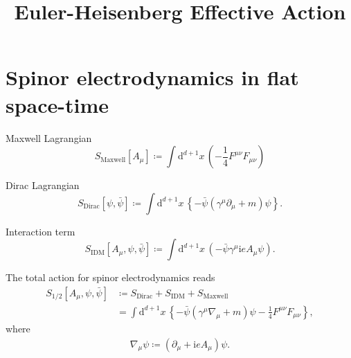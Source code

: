 \documentclass[12pt]{article}
\newcommand\mi{\mathrm{i}} %
\newcommand\dif{\mathrm{d}}
\newcommand{\rbr}[1]{{\left(#1\right)}}
\newcommand{\cbr}[1]{{\left\{#1\right\}}}
\newcommand{\sfun}[2]{{#1}\mathopen{}\left[#2\right]\mathclose{}}
\begin{document}
\title{Euler-Heisenberg Effective Action} 


\date{}







\maketitle

%



\section{Spinor electrodynamics in flat space-time}

Maxwell Lagrangian
\begin{equation}
\sfun{S_\text{Maxwell}}{A_\mu} \coloneqq \int\dif^{d+1} x\,\rbr{
-\frac{1}{4} F^{\mu\nu} F_{\mu\nu} }
\end{equation}

Dirac Lagrangian \citep[sec.~11]{weinberg1995}
\begin{equation}
\sfun{S_\text{Dirac}}{\psi, \bar\psi} \coloneqq \int\dif^{d+1} x\,
\cbr{-\bar{\psi} \rbr{\gamma^\mu\partial_\mu + m}\psi}.
\end{equation}

Interaction term
\begin{equation}
\sfun{S_\text{IDM}}{A_\mu, \psi, \bar\psi} \coloneqq \int\dif^{d+1} 
x\,\rbr{-\bar{\psi}\gamma^\mu\mi e A_\mu\psi}.
\end{equation}

The total action for spinor electrodynamics reads
\begin{align}
\sfun{S_{1/2}}{A_\mu, \psi, \bar\psi} &\coloneqq 
S_\text{Dirac} + S_\text{IDM}+S_\text{Maxwell} \nonumber \\
&= \int\dif^{d+1}x\,\cbr{-\bar\psi\rbr{\gamma^\mu \nabla_\mu+m}\psi
-\frac{1}{4}F^{\mu\nu}F_{\mu\nu}},
\end{align}
where
\begin{align}
\nabla_\mu\psi \coloneqq \rbr{\partial_\mu+\mi e A_\mu}\psi.
\end{align}
\end{document}

